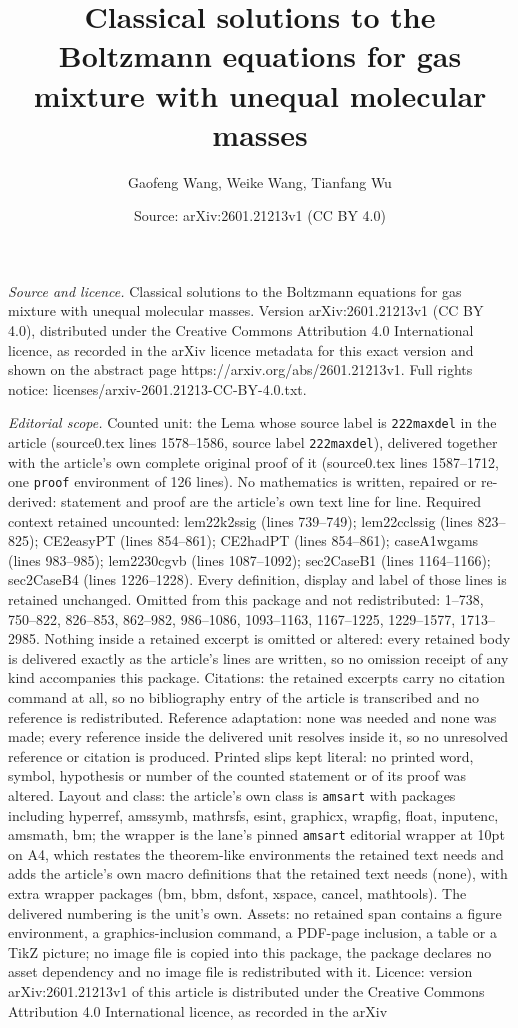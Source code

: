 \documentclass[10pt,a4paper]{amsart}
\title[Classical solutions to the Boltzmann equations for gas mixtu]{Classical solutions to the Boltzmann equations for gas mixture with unequal molecular masses}
\author{Gaofeng Wang, Weike Wang, Tianfang Wu}
\date{Source: arXiv:2601.21213v1 (CC BY 4.0)}
\begin{document}
\maketitle

\noindent\emph{Source and licence.} Classical solutions to the Boltzmann equations for gas mixture with unequal molecular masses. Version arXiv:2601.21213v1 (CC BY 4.0), distributed under the Creative Commons Attribution 4.0 International licence, as recorded in the arXiv licence metadata for this exact version and shown on the abstract page https://arxiv.org/abs/2601.21213v1. Full rights notice: licenses/arxiv-2601.21213-CC-BY-4.0.txt.\par\smallskip

\noindent\textit{Editorial scope.} Counted unit: the Lema whose source label is \texttt{222maxdel} in the article (source0.tex lines 1578--1586, source label \texttt{222maxdel}), delivered together with the article's own complete original proof of it (source0.tex lines 1587--1712, one \texttt{proof} environment of 126 lines). No mathematics is written, repaired or re-derived: statement and proof are the article's own text line for line. Required context retained uncounted: lem22k2ssig (lines 739--749); lem22cclssig (lines 823--825); CE2easyPT (lines 854--861); CE2hadPT (lines 854--861); caseA1wgams (lines 983--985); lem2230cgvb (lines 1087--1092); sec2CaseB1 (lines 1164--1166); sec2CaseB4 (lines 1226--1228). Every definition, display and label of those lines is retained unchanged. Omitted from this package and not redistributed: 1--738, 750--822, 826--853, 862--982, 986--1086, 1093--1163, 1167--1225, 1229--1577, 1713--2985. Nothing inside a retained excerpt is omitted or altered: every retained body is delivered exactly as the article's lines are written, so no omission receipt of any kind accompanies this package. Citations: the retained excerpts carry no citation command at all, so no bibliography entry of the article is transcribed and no reference is redistributed. Reference adaptation: none was needed and none was made; every reference inside the delivered unit resolves inside it, so no unresolved reference or citation is produced. Printed slips kept literal: no printed word, symbol, hypothesis or number of the counted statement or of its proof was altered. Layout and class: the article's own class is \texttt{amsart} with packages including hyperref, amssymb, mathrsfs, esint, graphicx, wrapfig, float, inputenc, amsmath, bm; the wrapper is the lane's pinned \texttt{amsart} editorial wrapper at 10pt on A4, which restates the theorem-like environments the retained text needs and adds the article's own macro definitions that the retained text needs (none), with extra wrapper packages (bm, bbm, dsfont, xspace, cancel, mathtools). The delivered numbering is the unit's own. Assets: no retained span contains a figure environment, a graphics-inclusion command, a PDF-page inclusion, a table or a TikZ picture; no image file is copied into this package, the package declares no asset dependency and no image file is redistributed with it. Licence: version arXiv:2601.21213v1 of this article is distributed under the Creative Commons Attribution 4.0 International licence, as recorded in the arXiv 
\end{document}
